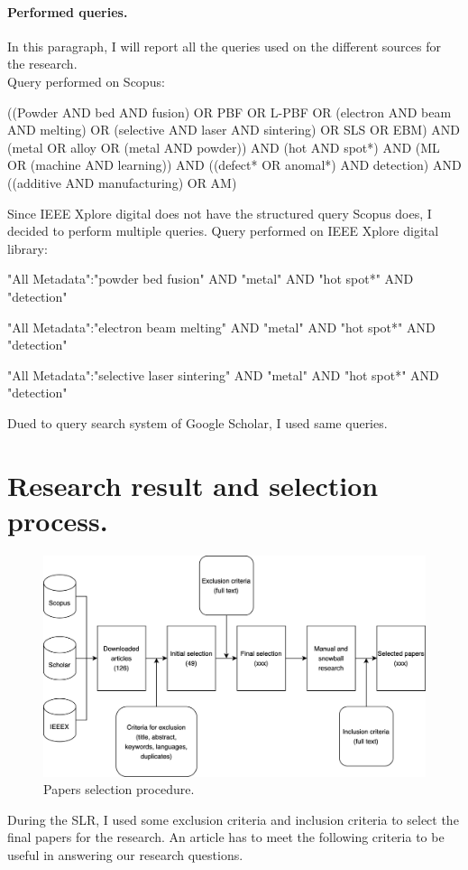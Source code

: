 \paragraph{Performed queries.} In this paragraph, I will report all the queries used on the different sources for the research. \\[1.5ex]
Query performed on Scopus:
\begin{tcolorbox}
\footnotesize
((Powder AND bed AND fusion) OR PBF OR L-PBF OR (electron AND beam AND melting) OR (selective AND laser AND sintering) OR SLS OR EBM) AND (metal OR alloy OR (metal AND powder)) AND  (hot AND spot*) AND (ML OR (machine AND learning)) AND ((defect* OR anomal*) AND detection) AND ((additive AND manufacturing) OR AM)
\end{tcolorbox}
Since IEEE Xplore digital does not have the structured query Scopus does, I decided to perform multiple queries. Query performed on IEEE Xplore digital library:
\begin{tcolorbox}
\footnotesize
"All Metadata":"powder bed fusion" AND "metal" AND "hot spot*" AND "detection"
\end{tcolorbox}
\begin{tcolorbox}
\footnotesize
"All Metadata":"electron beam melting" AND "metal" AND "hot spot*" AND "detection"
\end{tcolorbox}
\begin{tcolorbox}
\footnotesize
"All Metadata":"selective laser sintering" AND "metal" AND "hot spot*" AND "detection"
\end{tcolorbox}
Dued to query search system of Google Scholar, I used same queries.



\section{Research result and selection process.}
\label{sec:resresults}
\begin{figure}
    \centering
    \includegraphics[scale=0.2]{Images/selezioncina.png}
    \caption[Papers selection procedure.] {Papers selection procedure.}
    \label{fig:selezioncina}
\end{figure}
During the SLR, I used some exclusion criteria and inclusion criteria to select the final papers for the research. 
An article has to meet the following criteria to be useful in answering our research questions.
